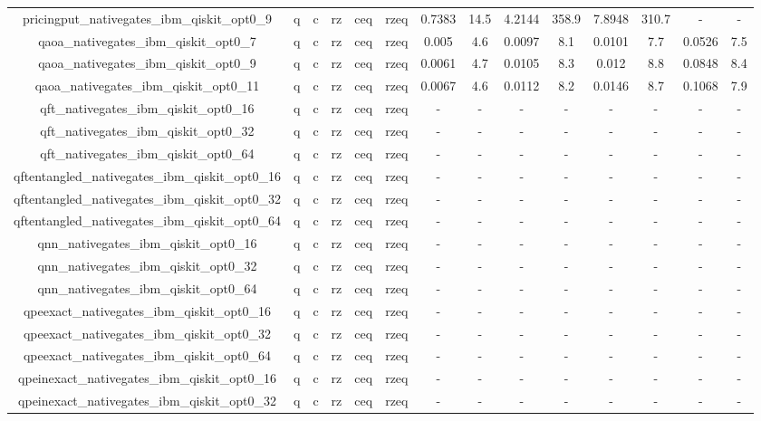 \begin{table}[htb]
{\begin{tabular}{|c|c|c|c|c|c|c|c|c|c|c|c|c|c|}
pricingput_nativegates_ibm_qiskit_opt0_9 & q & c & rz & ceq & rzeq & 0.7383 & 14.5 & 4.2144 & 358.9 & 7.8948 & 310.7 & - & - \\ 
qaoa_nativegates_ibm_qiskit_opt0_7 & q & c & rz & ceq & rzeq & 0.005 & 4.6 & 0.0097 & 8.1 & 0.0101 & 7.7 & 0.0526 & 7.5 \\ 
qaoa_nativegates_ibm_qiskit_opt0_9 & q & c & rz & ceq & rzeq & 0.0061 & 4.7 & 0.0105 & 8.3 & 0.012 & 8.8 & 0.0848 & 8.4 \\ 
qaoa_nativegates_ibm_qiskit_opt0_11 & q & c & rz & ceq & rzeq & 0.0067 & 4.6 & 0.0112 & 8.2 & 0.0146 & 8.7 & 0.1068 & 7.9 \\ 
qft_nativegates_ibm_qiskit_opt0_16 & q & c & rz & ceq & rzeq & - & - & - & - & - & - & - & - \\ 
qft_nativegates_ibm_qiskit_opt0_32 & q & c & rz & ceq & rzeq & - & - & - & - & - & - & - & - \\ 
qft_nativegates_ibm_qiskit_opt0_64 & q & c & rz & ceq & rzeq & - & - & - & - & - & - & - & - \\ 
qftentangled_nativegates_ibm_qiskit_opt0_16 & q & c & rz & ceq & rzeq & - & - & - & - & - & - & - & - \\ 
qftentangled_nativegates_ibm_qiskit_opt0_32 & q & c & rz & ceq & rzeq & - & - & - & - & - & - & - & - \\ 
qftentangled_nativegates_ibm_qiskit_opt0_64 & q & c & rz & ceq & rzeq & - & - & - & - & - & - & - & - \\ 
qnn_nativegates_ibm_qiskit_opt0_16 & q & c & rz & ceq & rzeq & - & - & - & - & - & - & - & - \\ 
qnn_nativegates_ibm_qiskit_opt0_32 & q & c & rz & ceq & rzeq & - & - & - & - & - & - & - & - \\ 
qnn_nativegates_ibm_qiskit_opt0_64 & q & c & rz & ceq & rzeq & - & - & - & - & - & - & - & - \\ 
qpeexact_nativegates_ibm_qiskit_opt0_16 & q & c & rz & ceq & rzeq & - & - & - & - & - & - & - & - \\ 
qpeexact_nativegates_ibm_qiskit_opt0_32 & q & c & rz & ceq & rzeq & - & - & - & - & - & - & - & - \\ 
qpeexact_nativegates_ibm_qiskit_opt0_64 & q & c & rz & ceq & rzeq & - & - & - & - & - & - & - & - \\ 
qpeinexact_nativegates_ibm_qiskit_opt0_16 & q & c & rz & ceq & rzeq & - & - & - & - & - & - & - & - \\ 
qpeinexact_nativegates_ibm_qiskit_opt0_32 & q & c & rz & ceq & rzeq & - & - & - & - & - & - & - & - \\ 

\end{tabular}}
\end{table}
